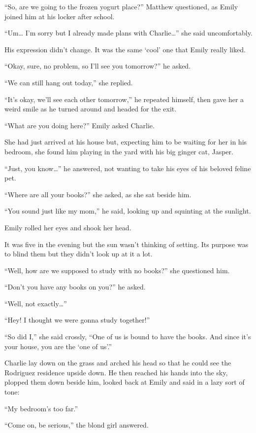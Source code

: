 “So, are we going to the frozen yogurt place?” Matthew questioned, as Emily joined him at his locker after school.

“Um… I'm sorry but I already made plans with Charlie…” she said uncomfortably.

His expression didn't change. It was the same ‘cool' one that Emily really liked.

“Okay, sure, no problem, so I'll see you tomorrow?” he asked.

“We can still hang out today,” she replied.

“It's okay, we'll see each other tomorrow,” he repeated himself, then gave her a weird smile as he turned around and headed for the exit.

\bigskip

“What are you doing here?” Emily asked Charlie.

She had just arrived at his house but, expecting him to be waiting for her in his bedroom, she found him playing in the yard with his big ginger cat, Jasper.

“Just, you know…” he answered, not wanting to take his eyes of his beloved feline pet.

“Where are all your books?” she asked, as she sat beside him.

“You sound just like my mom,” he said, looking up and squinting at the sunlight.

Emily rolled her eyes and shook her head.

It was five in the evening but the sun wasn't thinking of setting. Its purpose was to blind them but they didn't look up at it a lot.

“Well, how are we supposed to study with no books?” she questioned him.

“Don't you have any books on you?” he asked.

“Well, not exactly…”

“Hey! I thought we were gonna study together!”

“So did I,” she said crossly, “One of us is bound to have the books. And since it's your house, you are the ‘one of us'.”

Charlie lay down on the grass and arched his head so that he could see the Rodriguez residence upside down. He then reached his hands into the sky, plopped them down beside him, looked back at Emily and said in a lazy sort of tone:

“My bedroom's too far.”

“Come on, be serious,” the blond girl answered.

